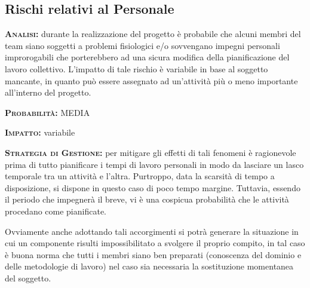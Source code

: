 \subsection{Rischi relativi al Personale}

\begin{description}
	\item{\scshape\bfseries Analisi:} durante la realizzazione del progetto è probabile che alcuni membri del team siano soggetti a problemi fisiologici e/o sovvengano impegni personali improrogabili che porterebbero ad una sicura modifica della pianificazione del lavoro collettivo. L'impatto di tale rischio è variabile in base al soggetto mancante, in quanto può essere assegnato ad un'attività più o meno importante all'interno del progetto. 
	\item{\scshape\bfseries Probabilità:} MEDIA
	\item{\scshape\bfseries Impatto:} variabile
	\item{\scshape\bfseries Strategia di Gestione:} per mitigare gli effetti di tali fenomeni è ragionevole prima di tutto pianificare i tempi di lavoro personali in modo da lasciare un lasco temporale tra un attività e l'altra.
Purtroppo, data la scarsità di tempo a disposizione, si dispone in questo caso di poco tempo margine. Tuttavia, essendo il periodo che impegnerà il  breve, vi è una cospicua probabilità che le attività procedano come pianificate.
	
Ovviamente anche adottando tali accorgimenti si potrà generare la situazione in cui un componente risulti impossibilitato a svolgere il proprio compito, in tal caso è buona norma che tutti i membri siano ben preparati (conoscenza del dominio e delle metodologie di lavoro) nel caso sia necessaria la sostituzione momentanea del soggetto.
\end{description}

